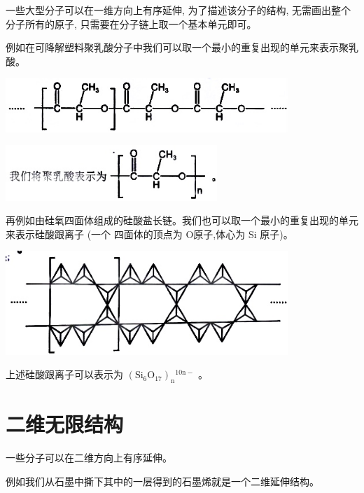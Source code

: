 \documentclass[10pt,cn]{elegantbook}
\begin{document}
 一些大型分子可以在一维方向上有序延伸, 为了描述该分子的结构, 无需画出整个分子所有的原子, 只需要在分子链上取一个基本单元即可。
 
 例如在可降解塑料聚乳酸分子中我们可以取一个最小的重复出现的单元来表示聚乳酸。
 
 \begin{center}
 	\includegraphics[max width=0.8\textwidth]{image/c121-1.jpg}
 \end{center}
 
 \begin{center}
 \includegraphics[max width=0.6\textwidth]{image/c121-2.jpg}
 \end{center}
 
 再例如由硅氧四面体组成的硅酸盐长链。我们也可以取一个最小的重复出现的单元来表示硅酸跟离子 (一个 四面体的顶点为 O原子,体心为 \(\mathrm{{Si}}\) 原子)。
 
 \begin{center}
	\includegraphics[max width=0.8\textwidth]{image/c121-3.jpg}
\end{center}
 
 上述硅酸跟离子可以表示为 \({\left( {\mathrm{{Si}}}_{6}{\mathrm{O}}_{17}\right) }_{\mathrm{n}}{}^{{10}\mathrm{n} - }\) 。
 
 
 
 \section{二维无限结构}
 
 一些分子可以在二维方向上有序延伸。
 
 例如我们从石墨中撕下其中的一层得到的石墨烯就是一个二维延伸结构。
 
\end{document}
